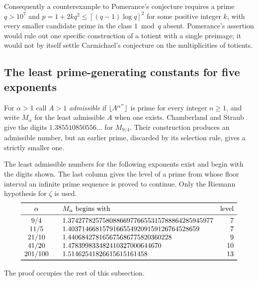 Consequently a counterexample to Pomerance's conjecture requires a prime $q>10^7$ and
$p=1+2kq^2\le[(q-1)\log q]^2$ for some positive integer $k$, with every smaller
candidate prime in the class $1\bmod q$ absent. Pomerance's assertion would rule out one
specific construction of a totient with a single preimage; it would not by itself
settle Carmichael's conjecture on the multiplicities of totients.

\subsection{The least prime-generating constants for five exponents}
\label{dir:sec:mills}

For $\alpha>1$ call $A>1$ \emph{admissible} if $\lfloor A^{\alpha^n}\rfloor$ is prime for
every integer $n\ge1$, and write $M_\alpha$ for the least admissible $A$ when one
exists. Chamberland and Straub \cite[Example~5.2]{ChamberlandStraub2026Prime} give the
digits $1.385510850556\ldots$ for $M_{9/4}$. Their construction produces an admissible
number, but an earlier prime, discarded by its selection rule, gives a strictly smaller
one.

\begin{theorem}\label{dir:thm:mills}
The least admissible numbers for the following exponents exist and begin with the
digits shown. The last column gives the level of a prime from whose floor interval an
infinite prime sequence is proved to continue. Only the Riemann hypothesis for $\zeta$
is used.
\[
\begin{array}{c@{\qquad}l@{\quad}r}
\toprule
\alpha & M_\alpha \text{ begins with} & \text{level}\\
\midrule
9/4 &1.374277825758088669776655315788864285945977 &7\\
11/5 &1.40371466815791665549209159126764528659 &7\\
21/10 &1.440684278165675686775820360228 &9\\
41/20 &1.478399833482410327000644670 &10\\
201/100 &1.51462541826615615161458 &13\\
\bottomrule
\end{array}
\]
\end{theorem}

The proof occupies the rest of this subsection.

